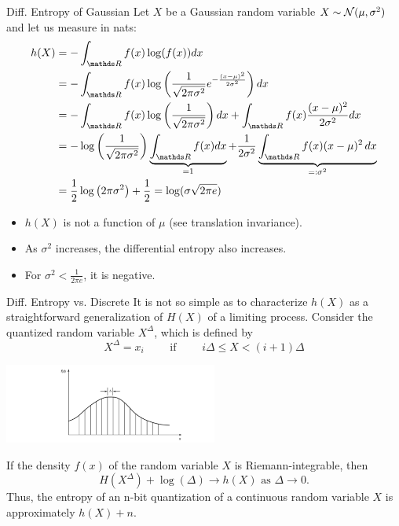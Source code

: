 \begin{vbframe}{Diff. Entropy of Gaussian}
Let $X$ be a Gaussian random variable $X \sim \mathcal{N}(\mu, \sigma^2)$ and let us measure in nats:
  \begin{equation*}
    \begin{aligned} 
     h(X) &= - \int_{\R} f(x) \log(f(x)) dx \\
          &=  - \int_{\R} f(x) \log\left(\frac{1}{\sqrt{2 \pi \sigma^{2}}} e^{-\frac{(x-\mu)^{2}}{2 \sigma^{2}}} \right) dx \\
          &= - \int_{\R} f(x) \log\left(\frac{1}{\sqrt{2 \pi \sigma^{2}}}\right) dx + \int_{\R} f(x) \frac{(x-\mu)^{2}}{2 \sigma^{2}} dx \\
          &= - \log \left(\frac{1}{\sqrt{2 \pi \sigma^{2}}}\right) \underbrace{\int_{\R} f(x) dx}_{= 1} + \frac{1}{2\sigma^2} \underbrace{\int_{\R} f(x) (x-\mu)^{2}\,dx}_{=: \sigma^2} \\
          &= \frac{1}{2} \log \left(2 \pi \sigma^{2}\right) + \frac{1}{2} =  \log(\sigma \sqrt{2\pi e})
    \end{aligned}
  \end{equation*}
\framebreak

  \begin{itemize}
    \item $h(X)$ is not a function of $\mu$ (see translation invariance).
    \item As $\sigma^2$ increases, the differential entropy also increases.
    \item For $\sigma^2 < \frac{1}{2\pi e}$, it is negative.
    
  \end{itemize}
\end{vbframe}


\begin{vbframe}{Diff. Entropy vs. Discrete}
It is not so simple as to characterize $h(X)$ as 
a straightforward generalization of $H(X)$ of a limiting process.
Consider the quantized random variable $X^\Delta$, which is defined by
$$X^\Delta = x_i \qquad \text{ if } \qquad i \Delta \leq X < (i + 1) \Delta$$  
\begin{center}
\includegraphics[width = 7cm ]{figure_man/diffent-quant.png} \\
\end{center}

If the density $f(x)$ of the random variable $X$ is Riemann-integrable, then
$$H(X^\Delta) + \log(\Delta) \rightarrow h(X) \text{ as } \Delta \rightarrow 0.$$
Thus, the entropy of an n-bit quantization of a continuous random variable 
$X$ is approximately $h(X) + n$.
\end{vbframe}

